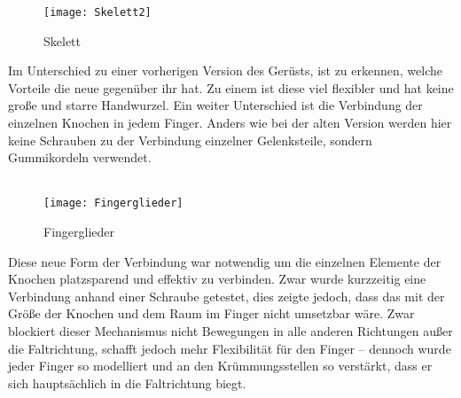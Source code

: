 \documentclass[titlepage,12pt,twoside]{article}
\begin{document}
\begin{figure}[H]
	\begin{center}
		\scalebox{1.2}
		{\texttt{[image: Skelett2]}}
		\caption{Skelett}
		\label{fig:Skelett2}			
	\end{center}
\end{figure}
\hfill \break
Im Unterschied zu einer vorherigen Version des Gerüsts, ist zu erkennen, welche Vorteile die neue gegenüber ihr hat. Zu einem ist diese viel flexibler und hat keine große und starre Handwurzel. 
Ein weiter Unterschied ist die Verbindung der einzelnen Knochen in jedem Finger. Anders wie bei der alten Version werden hier keine Schrauben zu der Verbindung einzelner Gelenksteile, sondern Gummikordeln verwendet. \\
\\
\begin{figure}[H]
	\begin{center}
		\scalebox{1.2}
		{\texttt{[image: Fingerglieder]}}
		\caption{Fingerglieder}
		\label{fig:Fingerglieder}			
	\end{center}
\end{figure}
\hfill \break
Diese neue Form der Verbindung war notwendig um die einzelnen Elemente der Knochen platzsparend und effektiv zu verbinden. Zwar wurde kurzzeitig eine Verbindung anhand einer Schraube getestet, dies zeigte jedoch, dass das mit der Größe der Knochen 
und dem Raum im Finger nicht umsetzbar wäre. Zwar blockiert dieser Mechanismus nicht Bewegungen in alle anderen Richtungen außer die Faltrichtung, schafft jedoch mehr Flexibilität für den Finger – dennoch wurde jeder Finger so modelliert und an den 
Krümmungsstellen so verstärkt, dass er sich hauptsächlich in die Faltrichtung biegt. \\
\\
\end{document}
